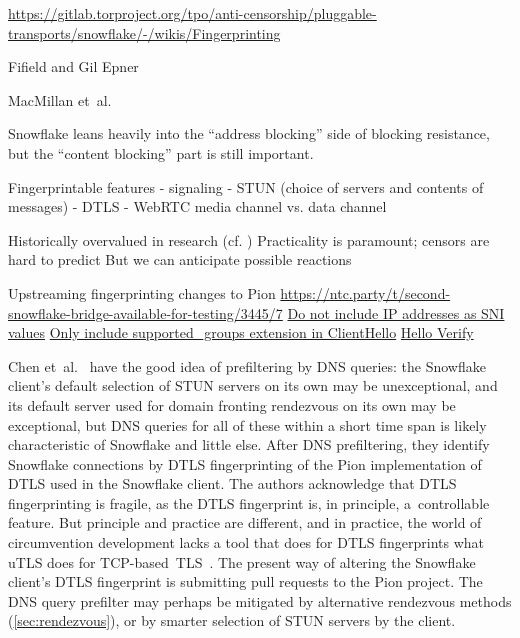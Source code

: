 \documentclass[letterpaper,twocolumn]{article}
\begin{document}

\url{https://gitlab.torproject.org/tpo/anti-censorship/pluggable-transports/snowflake/-/wikis/Fingerprinting}

Fifield and Gil Epner~\cite{arxiv.1605.08805}

MacMillan et~al.~\cite{arxiv.2008.03254}

Snowflake leans heavily into the ``address blocking'' side of blocking
resistance, but the ``content blocking'' part is still important.

Fingerprintable features
- signaling
- STUN (choice of servers and contents of messages)
- DTLS
- WebRTC media channel vs. data channel

Historically overvalued in research (cf. \cite{Tschantz2016a})
Practicality is paramount; censors are hard to predict
But we can anticipate possible reactions

Upstreaming fingerprinting changes to Pion
\url{https://ntc.party/t/second-snowflake-bridge-available-for-testing/3445/7}
  \href{https://github.com/pion/dtls/pull/407}{Do not include IP addresses as SNI values}
  \href{https://github.com/pion/dtls/pull/410}{Only include supported\_groups extension in ClientHello}
\href{https://bugs.torproject.org/tpo/anti-censorship/pluggable-transports/snowflake/40249}{Hello Verify}

Chen et~al.~\cite{Chen2023a}
have the good idea of prefiltering by DNS queries:
the Snowflake client's default selection of STUN servers
on its own may be unexceptional,
and its default server used for domain fronting rendezvous
on its own may be exceptional,
but DNS queries for all of these within a short time span
is likely characteristic of Snowflake and little else.
After DNS prefiltering, they identify Snowflake connections
by DTLS fingerprinting of the Pion implementation of DTLS
used in the Snowflake client.
The authors acknowledge that DTLS fingerprinting
is fragile, as the DTLS fingerprint is, in principle,
a~controllable feature.
But principle and practice are different,
and in practice,
the world of circumvention development
lacks a tool that does for DTLS fingerprints
what uTLS does for TCP-based~TLS~\cite[\S VII]{Frolov2019a}.
The present way of altering the Snowflake client's DTLS fingerprint
is submitting pull requests to the Pion project.
The DNS query prefilter may perhaps be mitigated
by alternative rendezvous methods (\autoref{sec:rendezvous}),
or by smarter selection of STUN servers by the client.
\end{document}
